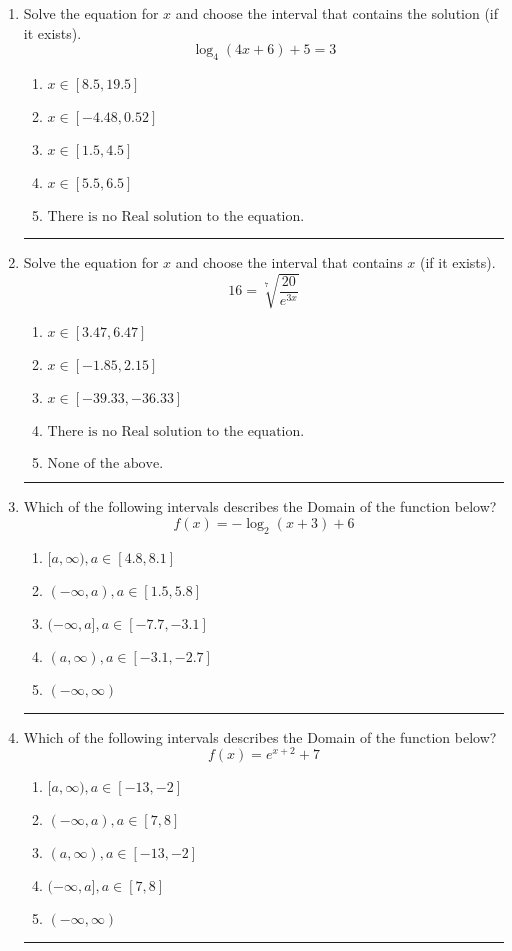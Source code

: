 \documentclass[14pt]{extbook}
\newcommand{\litem}[1]{\item#1\hspace*{-1cm}\rule{\textwidth}{0.4pt}}
\begin{document}
\begin{enumerate}
{\begin{enumerate}[label=\Alph*.]
\end{enumerate} }
\litem{
Solve the equation for $x$ and choose the interval that contains the solution (if it exists).\[ \log_{4}{(4x+6)}+5 = 3 \]\begin{enumerate}[label=\Alph*.]
\item \( x \in [8.5, 19.5] \)
\item \( x \in [-4.48, 0.52] \)
\item \( x \in [1.5, 4.5] \)
\item \( x \in [5.5, 6.5] \)
\item \( \text{There is no Real solution to the equation.} \)

\end{enumerate} }
\litem{
 Solve the equation for $x$ and choose the interval that contains $x$ (if it exists).\[  16 = \sqrt[7]{\frac{20}{e^{3x}}} \]\begin{enumerate}[label=\Alph*.]
\item \( x \in [3.47, 6.47] \)
\item \( x \in [-1.85, 2.15] \)
\item \( x \in [-39.33, -36.33] \)
\item \( \text{There is no Real solution to the equation.} \)
\item \( \text{None of the above.} \)

\end{enumerate} }
\litem{
Which of the following intervals describes the Domain of the function below?\[ f(x) = -\log_2{(x+3)}+6 \]\begin{enumerate}[label=\Alph*.]
\item \( [a, \infty), a \in [4.8, 8.1] \)
\item \( (-\infty, a), a \in [1.5, 5.8] \)
\item \( (-\infty, a], a \in [-7.7, -3.1] \)
\item \( (a, \infty), a \in [-3.1, -2.7] \)
\item \( (-\infty, \infty) \)

\end{enumerate} }
\litem{
Which of the following intervals describes the Domain of the function below?\[ f(x) = e^{x+2}+7 \]\begin{enumerate}[label=\Alph*.]
\item \( [a, \infty), a \in [-13, -2] \)
\item \( (-\infty, a), a \in [7, 8] \)
\item \( (a, \infty), a \in [-13, -2] \)
\item \( (-\infty, a], a \in [7, 8] \)
\item \( (-\infty, \infty) \)


\end{enumerate}}
\end{enumerate}
\end{document}
